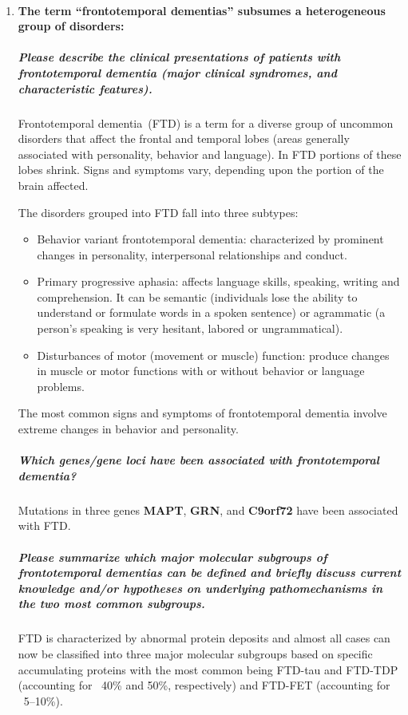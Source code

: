 \documentclass[12pt,article,oneside,a4paper]{memoir}
\begin{document}
\begin{enumerate}
\item \paragraph{The term ``frontotemporal dementias'' subsumes a heterogeneous
group of disorders:}

\subparagraph{Please describe the clinical presentations of patients with
frontotemporal dementia (major clinical syndromes, and characteristic
features).}

Frontotemporal dementia~(FTD) is a term for a diverse group of uncommon
disorders that affect the frontal and temporal lobes (areas generally
associated with personality, behavior and language). In FTD portions of these
lobes shrink. Signs and symptoms vary, depending upon the portion of the brain
affected.

The disorders grouped into FTD fall into three subtypes:
\begin{itemize}
\item Behavior variant frontotemporal dementia: characterized by prominent
changes in personality, interpersonal relationships and conduct.
\item Primary progressive aphasia: affects language skills, speaking, writing
and comprehension. It can be semantic (individuals lose the ability to
understand or formulate words in a spoken sentence) or agrammatic (a person's
speaking is very hesitant, labored or ungrammatical).
\item Disturbances of motor (movement or muscle) function: produce changes in
muscle or motor functions with or without behavior or language problems.
\end{itemize}
The most common signs and symptoms of frontotemporal dementia involve extreme
changes in behavior and personality.

\subparagraph{Which genes/gene loci have been associated with frontotemporal
dementia?}

Mutations in three genes \textbf{MAPT}, \textbf{GRN}, and \textbf{C9orf72} have
been associated with FTD. 

\subparagraph{Please summarize which major molecular subgroups of
frontotemporal dementias can be defined and briefly discuss current knowledge
and/or hypotheses on underlying pathomechanisms in the two most common
subgroups.}

FTD is characterized by abnormal protein deposits and almost all cases can now
be classified into three major molecular subgroups based on specific
accumulating proteins with the most common being FTD-tau and FTD-TDP
(accounting for ~40\% and 50\%, respectively) and FTD-FET (accounting for
~5–10\%).


\end{enumerate}
\end{document}

